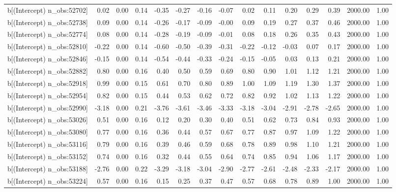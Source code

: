 \begin{table}[ht]
\begin{tabular}{rrrrrrrrrrrrrrr}
  b[(Intercept) n\_obs:52702] & 0.02 & 0.00 & 0.14 & -0.35 & -0.27 & -0.16 & -0.07 & 0.02 & 0.11 & 0.20 & 0.29 & 0.39 & 2000.00 & 1.00 \\ 
  b[(Intercept) n\_obs:52738] & 0.09 & 0.00 & 0.14 & -0.26 & -0.17 & -0.09 & -0.00 & 0.09 & 0.19 & 0.27 & 0.37 & 0.46 & 2000.00 & 1.00 \\ 
  b[(Intercept) n\_obs:52774] & 0.08 & 0.00 & 0.14 & -0.28 & -0.19 & -0.09 & -0.01 & 0.08 & 0.18 & 0.26 & 0.35 & 0.43 & 2000.00 & 1.00 \\ 
  b[(Intercept) n\_obs:52810] & -0.22 & 0.00 & 0.14 & -0.60 & -0.50 & -0.39 & -0.31 & -0.22 & -0.12 & -0.03 & 0.07 & 0.17 & 2000.00 & 1.00 \\ 
  b[(Intercept) n\_obs:52846] & -0.15 & 0.00 & 0.14 & -0.54 & -0.44 & -0.33 & -0.24 & -0.15 & -0.05 & 0.03 & 0.13 & 0.21 & 2000.00 & 1.00 \\ 
  b[(Intercept) n\_obs:52882] & 0.80 & 0.00 & 0.16 & 0.40 & 0.50 & 0.59 & 0.69 & 0.80 & 0.90 & 1.01 & 1.12 & 1.21 & 2000.00 & 1.00 \\ 
  b[(Intercept) n\_obs:52918] & 0.99 & 0.00 & 0.15 & 0.61 & 0.70 & 0.80 & 0.89 & 1.00 & 1.09 & 1.19 & 1.30 & 1.37 & 2000.00 & 1.00 \\ 
  b[(Intercept) n\_obs:52954] & 0.82 & 0.00 & 0.15 & 0.44 & 0.53 & 0.62 & 0.72 & 0.82 & 0.92 & 1.02 & 1.13 & 1.22 & 2000.00 & 1.00 \\ 
  b[(Intercept) n\_obs:52990] & -3.18 & 0.00 & 0.21 & -3.76 & -3.61 & -3.46 & -3.33 & -3.18 & -3.04 & -2.91 & -2.78 & -2.65 & 2000.00 & 1.00 \\ 
  b[(Intercept) n\_obs:53026] & 0.51 & 0.00 & 0.16 & 0.12 & 0.20 & 0.30 & 0.40 & 0.51 & 0.62 & 0.73 & 0.84 & 0.93 & 2000.00 & 1.00 \\ 
  b[(Intercept) n\_obs:53080] & 0.77 & 0.00 & 0.16 & 0.36 & 0.44 & 0.57 & 0.67 & 0.77 & 0.87 & 0.97 & 1.09 & 1.22 & 2000.00 & 1.00 \\ 
  b[(Intercept) n\_obs:53116] & 0.79 & 0.00 & 0.16 & 0.39 & 0.46 & 0.59 & 0.68 & 0.78 & 0.89 & 0.98 & 1.10 & 1.21 & 2000.00 & 1.00 \\ 
  b[(Intercept) n\_obs:53152] & 0.74 & 0.00 & 0.16 & 0.32 & 0.44 & 0.55 & 0.64 & 0.74 & 0.85 & 0.94 & 1.06 & 1.17 & 2000.00 & 1.00 \\ 
  b[(Intercept) n\_obs:53188] & -2.76 & 0.00 & 0.22 & -3.29 & -3.18 & -3.04 & -2.90 & -2.77 & -2.61 & -2.48 & -2.33 & -2.17 & 2000.00 & 1.00 \\ 
  b[(Intercept) n\_obs:53224] & 0.57 & 0.00 & 0.16 & 0.15 & 0.25 & 0.37 & 0.47 & 0.57 & 0.68 & 0.78 & 0.89 & 1.00 & 2000.00 & 1.00 \\ 

\end{tabular}
\end{table}
